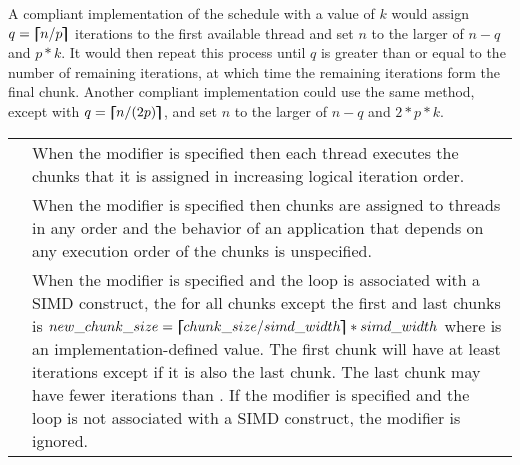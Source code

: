 A compliant implementation of the  schedule with a  value of $k$ 
would assign $q = \bm{\lceil\mkern-10mu\lceil} n/p \bm{\rceil\mkern-10mu\rceil}$ iterations to the first available thread and set $n$ to the larger of 
$n-q$ and $p*k$. It would then repeat this process until $q$ is greater than or equal to the 
number of remaining iterations, at which time the remaining iterations form the final 
chunk. Another compliant implementation could use the same method, except with 
$q = \bm{\lceil\mkern-10mu\lceil} n/(2p) \bm{\rceil\mkern-10mu\rceil}$, and set $n$ to the larger of $n-q$ and $2*p*k$. 
\noteend

\pagebreak
\vspace{1ex}\renewcommand{\arraystretch}{1.5}
\tablefirsthead{%
\hline\\[-3ex]
}
\tablelasttail{\hline}
\begin{supertabular}{ p{1in} p{4.1in} }
 & When the  modifier is specified then each thread executes the chunks 
that it is assigned in increasing logical iteration order.\\
 & When the  modifier is specified then chunks are assigned to threads 
in any order and the behavior of an application that depends on any execution order of the chunks is unspecified.\\
 & When the  modifier is specified and the loop is associated with a SIMD construct, the  for all chunks except the first and last chunks  is  $new\_chunk\_size = \bm{\lceil\mkern-10mu\lceil} chunk\_size / simd\_width \bm{\rceil\mkern-10mu\rceil} * simd\_width $ where  is an implementation-defined value. The first chunk will have at least  iterations except if it is also the last chunk. The last chunk may have fewer iterations than . If the  modifier is specified and the loop is not associated  with a SIMD construct, the modifier is ignored.\\
\end{supertabular}

